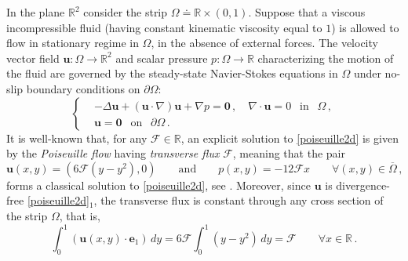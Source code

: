 \documentclass[11pt]{article}
\numberwithin{equation}{section}
\numberwithin{figure}{section}
\newcommand{\R}{\mathbb{R}}
\def\R{{\mathbb R}}
\def\Fe{{\mathcal F}}
\def\ue{{\mathbf u}}
\def\0{{\mathbf 0}}
\def\ee{{\mathbf e}}
\begin{document}
In the plane $\mathbb{R}^2$ consider the strip $\Omega \doteq \R\times(0,1)$. Suppose that a viscous incompressible fluid (having constant kinematic viscosity equal to $1$) is allowed to flow in stationary regime in $\Omega$, in the absence of external forces. The velocity vector field $\mathbf{u} : \Omega \longrightarrow \mathbb{R}^2$ and scalar pressure $p : \Omega \longrightarrow \mathbb{R}$ characterizing the motion of the fluid are governed by the steady-state Navier-Stokes equations in $\Omega$ under no-slip boundary conditions on $\partial \Omega$:
\begin{equation}\label{poiseuille2d}
	\left\{
	\begin{aligned}
		&- \Delta \mathbf{u} + (\mathbf{u} \cdot \nabla) \mathbf{u} + \nabla p = \0 \, , \quad \nabla \cdot \mathbf{u} = 0 \ \ \mbox{ in } \ \ \Omega \, , \\[4pt]
		&\mathbf{u} = \0 \ \ \mbox{ on } \ \ \partial \Omega \, .
	\end{aligned}
	\right.
\end{equation}
It is well-known that, for any $\Fe \in \mathbb{R}$, an explicit solution to \eqref{poiseuille2d} is given by the \textit{Poiseuille flow} having \textit{transverse flux} $\Fe$, meaning that the pair
\begin{equation} \label{eq:Poi}
	\ue(x,y)= ( 6\Fe(y - y^2), 0) \qquad \text{and} \qquad p(x,y)=-12\Fe x \qquad \forall (x,y) \in \overline{\Omega} \, ,
\end{equation}
forms a classical solution to \eqref{poiseuille2d}, see \cite[Chapter II]{landau}. Moreover, since $\ue$ is divergence-free \eqref{poiseuille2d}$_1$, the transverse flux is constant through any cross section of the strip $\Omega$, that is,
$$
\int_0^1 (\ue(x,y) \cdot \ee_1 ) \, dy = 6\Fe \int_0^1 (y - y^2) \, dy = \Fe \qquad \forall x\in \mathbb{R} \, .
$$
\end{document}
